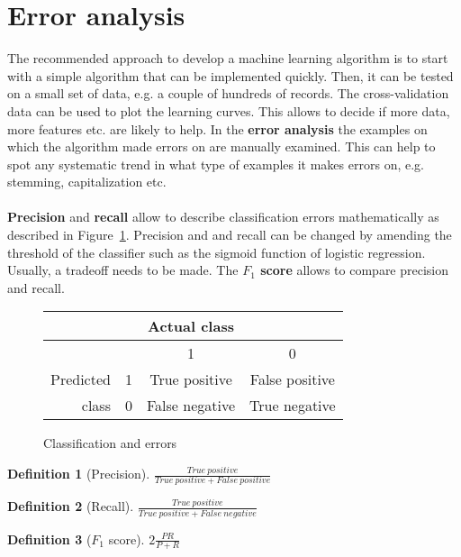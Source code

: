 \documentclass{report}
\newtheorem{definition}{Definition}[section]
\begin{document}
\section{Error analysis}
\label{chapter:erroranalysis}
The recommended approach to develop a machine learning algorithm is to start with a simple algorithm that can be implemented quickly.
Then, it can be tested on a small set of data, e.g. a couple of hundreds of records. The cross-validation data can be used to plot the learning curves.
This allows to decide if more data, more features etc. are likely to help. In the {\bf error analysis} the examples on which the algorithm made errors on are manually examined.
This can help to spot any systematic trend in what type of examples it makes errors on, e.g. stemming, capitalization etc.
\\ \\
{\bf Precision} and {\bf recall} allow to describe classification errors mathematically as described in Figure~\ref{ref:classificationerror}.
Precision and and recall can be changed by amending the threshold of the classifier such as the sigmoid function of logistic regression. Usually, a tradeoff needs to be made. The {\bf $F_1$ score} allows to compare precision and recall.

\begin{figure}[h!]
\centering
\begin{tabular}{r||ccc}
& & Actual class & \\
\hline
\hline
& & 1 & 0 \\
Predicted & 1 & True positive & False positive \\
class & 0 & False negative & True negative \\
\end{tabular}
\caption{Classification and errors}
\label{ref:classificationerror}
\end{figure}


\begin{definition}[Precision]
$\frac{True\:positive}{True\:positive + False\:positive}$
\end{definition}

\begin{definition}[Recall]
$\frac{True\:positive}{True\:positive + False\:negative}$
\end{definition}

\begin{definition}[$F_1$ score]
$2\frac{PR}{P+R}$
\end{definition}
\end{document}
